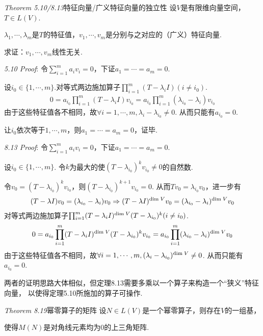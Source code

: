 \textit{Theorem 5.10/8.13}{\kaishu 特征向量/广义特征向量的独立性}
设$V$是有限维向量空间，$T \in L(V)$.

$\lambda_1,\cdots,\lambda_m$是$T$的特征值，$v_1,\cdots,v_m$是分别与之对应的（广义）特征向量.

求证：$v_1,\cdots,v_m$线性无关.

\textit{5.10 Proof}:
令$\sum_{i=1}^m a_iv_i=0$，下证$a_1=\cdots=a_m=0$.

设$i_0 \in \{1,\cdots,m\}$.对等式两边施加算子$\prod_{i=1}^m (T-\lambda_i I)(i \ne i_0)$.
    \begin{align*}
        0=a_{i_0}\prod_{i=1}^m (T-\lambda_i I) v_{i_0}=
        a_{i_0}\prod_{i=1}^m (\lambda_{i_0}-\lambda_i) v_{i_0}
    \end{align*}
由于这些特征值各不相同，故$\forall i=1,\cdots,m,\lambda_i-\lambda_{i_0} \ne 0$.
从而只能有$a_{i_0}=0$.

让$i_0$依次等于$1,\cdots,m$，则$a_1=\cdots=a_m=0$，证毕.

\textit{8.13 Proof}:
令$\sum_{i=1}^m a_iv_i=0$，下证$a_1=\cdots=a_m=0$.

设$i_0 \in \{1,\cdots,m\}$.
令$k$为最大的使$(T-\lambda_{i_0})^k v_{i_0} \ne 0$的自然数.

令$v_0=(T-\lambda_{i_0})^k v_{i_0}$，则$(T-\lambda_{i_0})^{k+1} v_{i_0}=0$.
从而$Tv_0=\lambda_{i_0}v_0$，进一步有
    \begin{align*}
        (T-\lambda I)v_0=(\lambda_{i_0}-\lambda_i)v_0 \Rightarrow 
        (T-\lambda I)^{\mathrm{dim \;} V} v_0=(\lambda_{i_0}-\lambda_i)^{\mathrm{dim \;} V}v_0
    \end{align*}
对等式两边施加算子$\prod_{i=1}^m (T-\lambda_i I)^{\mathrm{dim \;} V}(T-\lambda_{i_0})^k(i \ne i_0)$.
    \begin{align*}
        0=a_{i_0}\prod_{i=1}^m (T-\lambda_i I)^{\mathrm{dim \;} V}(T-\lambda_{i_0})^k v_{i_0}
        =a_{i_0}\prod_{i=1}^m (\lambda_{i_0}-\lambda_i)^{\mathrm{dim \;} V} v_0
    \end{align*}
由于这些特征值各不相同，故$\forall i=1,\cdots,m,(\lambda_i-\lambda_{i_0})^{\mathrm{dim \;} V} \ne 0$.
从而只能有$a_{i_0}=0$.

两者的证明思路大体相似，但定理8.13需要多乘以一个算子来构造一个“狭义”特征向量，
以使得定理5.10所施加的算子可操作.

\hspace*{\fill}

\textit{Theorem 8.19}{\kaishu 幂零算子的矩阵}
设$N \in L(V)$是一个幂零算子，则存在$V$的一组基，

使得$M(N)$是对角线元素均为$0$的上三角矩阵.

